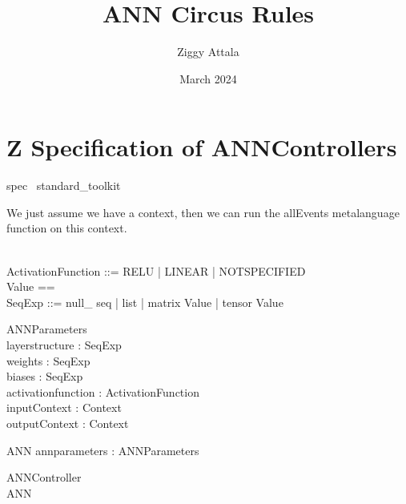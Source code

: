 \documentclass{article}
\title{ANN Circus Rules}
\author{Ziggy Attala}
\date{March 2024}
\begin{document}
\maketitle

\section{Z Specification of ANNControllers}

\begin{zsection}	 \SECTION spec \parents~standard\_toolkit
\end{zsection}


We just assume we have a context, then we can run the allEvents metalanguage function on this context. 
\begin{zed}
	[ Context ] \\
	ActivationFunction ::= RELU | LINEAR | NOTSPECIFIED \\
	Value == \arithmos \\
	SeqExp ::= null\_ seq | list \ldata \seq \nat \rdata | matrix \ldata \seq \seq Value \rdata | tensor \ldata \seq \seq \seq Value \rdata
\end{zed}

\begin{schema}{ANNParameters}
\\
 layerstructure : SeqExp \\
 weights : SeqExp \\
 biases : SeqExp \\
 activationfunction : ActivationFunction \\
 inputContext : Context \\
 outputContext : Context \\
\end{schema}

\begin{schema}{ANN} 
   annparameters : ANNParameters
\end{schema} 

\begin{schema}{ANNController}
\\
ANN
\end{schema}
\end{document}
